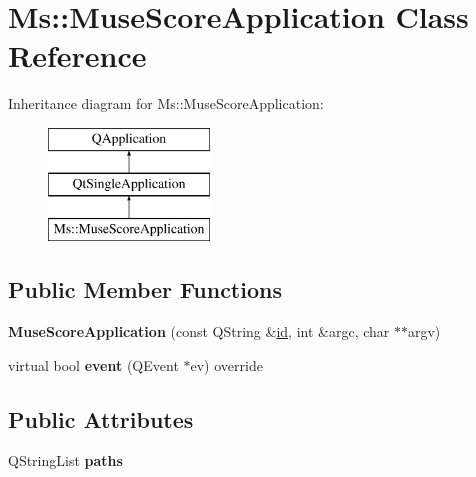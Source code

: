 \hypertarget{class_ms_1_1_muse_score_application}{}\section{Ms\+:\+:Muse\+Score\+Application Class Reference}
\label{class_ms_1_1_muse_score_application}
Inheritance diagram for Ms\+:\+:Muse\+Score\+Application\+:\begin{figure}[H]
\begin{center}
\leavevmode
\includegraphics[height=3.000000cm]{class_ms_1_1_muse_score_application}
\end{center}
\end{figure}
\subsection*{Public Member Functions}
\begin{DoxyCompactItemize}
\item 
\mbox{\label{class_ms_1_1_muse_score_application_a413bf5c7ff3784d6059ca04b3d59e070}} 
{\bfseries Muse\+Score\+Application} (const Q\+String \&\hyperlink{class_qt_single_application_a025290493ba51d3eba54d0041502a380}{id}, int \&argc, char $\ast$$\ast$argv)
\item 
\mbox{\label{class_ms_1_1_muse_score_application_a8292f61c9315a6e40a2a8700402a2635}} 
virtual bool {\bfseries event} (Q\+Event $\ast$ev) override
\end{DoxyCompactItemize}
\subsection*{Public Attributes}
\begin{DoxyCompactItemize}
\item 
\mbox{\label{class_ms_1_1_muse_score_application_a96441e28cfa965943922c1e73c73f8e2}} 
Q\+String\+List {\bfseries paths}
\end{DoxyCompactItemize}
